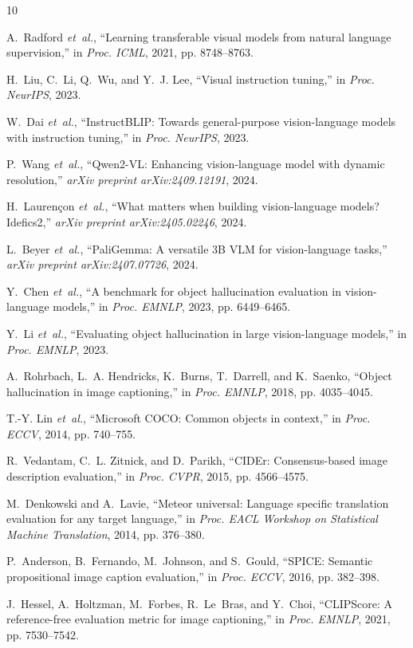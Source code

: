 \documentclass[conference]{IEEEtran}
\begin{document}

\begin{thebibliography}{10}

A.~Radford \emph{et~al.}, ``Learning transferable visual models from natural language supervision,'' in \emph{Proc. ICML}, 2021, pp. 8748--8763.

H.~Liu, C.~Li, Q.~Wu, and Y.~J. Lee, ``Visual instruction tuning,'' in \emph{Proc. NeurIPS}, 2023.

W.~Dai \emph{et~al.}, ``Instruct{BLIP}: Towards general-purpose vision-language models with instruction tuning,'' in \emph{Proc. NeurIPS}, 2023.

P.~Wang \emph{et~al.}, ``{Qwen2-VL}: Enhancing vision-language model with dynamic resolution,'' \emph{arXiv preprint arXiv:2409.12191}, 2024.

H.~Lauren{\c{c}}on \emph{et~al.}, ``What matters when building vision-language models? {Idefics2},'' \emph{arXiv preprint arXiv:2405.02246}, 2024.

L.~Beyer \emph{et~al.}, ``{PaliGemma}: A versatile 3{B} {VLM} for vision-language tasks,'' \emph{arXiv preprint arXiv:2407.07726}, 2024.

Y.~Chen \emph{et~al.}, ``A benchmark for object hallucination evaluation in vision-language models,'' in \emph{Proc. EMNLP}, 2023, pp. 6449--6465.

Y.~Li \emph{et~al.}, ``Evaluating object hallucination in large vision-language models,'' in \emph{Proc. EMNLP}, 2023.

A.~Rohrbach, L.~A. Hendricks, K.~Burns, T.~Darrell, and K.~Saenko, ``Object hallucination in image captioning,'' in \emph{Proc. EMNLP}, 2018, pp. 4035--4045.

T.-Y. Lin \emph{et~al.}, ``Microsoft {COCO}: Common objects in context,'' in \emph{Proc. ECCV}, 2014, pp. 740--755.

R.~Vedantam, C.~L. Zitnick, and D.~Parikh, ``{CIDEr}: Consensus-based image description evaluation,'' in \emph{Proc. CVPR}, 2015, pp. 4566--4575.

M.~Denkowski and A.~Lavie, ``Meteor universal: Language specific translation evaluation for any target language,'' in \emph{Proc. EACL Workshop on Statistical Machine Translation}, 2014, pp. 376--380.

P.~Anderson, B.~Fernando, M.~Johnson, and S.~Gould, ``{SPICE}: Semantic propositional image caption evaluation,'' in \emph{Proc. ECCV}, 2016, pp. 382--398.

J.~Hessel, A.~Holtzman, M.~Forbes, R.~Le~Bras, and Y.~Choi, ``{CLIPScore}: A reference-free evaluation metric for image captioning,'' in \emph{Proc. EMNLP}, 2021, pp. 7530--7542.

\end{thebibliography}
\end{document}
